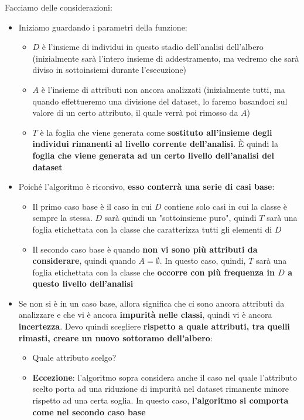 \documentclass[12pt]{article}
\begin{document}
Facciamo delle considerazioni:
\begin{itemize}
    \item Iniziamo guardando i parametri della funzione:
    \begin{itemize}
        \item $D$ è l'insieme di individui in questo stadio dell'analisi dell'albero (inizialmente sarà l'intero insieme di addestramento, ma vedremo che sarà diviso in sottoinsiemi durante l'esecuzione)
        \item $A$ è l'insieme di attributi non ancora analizzati (inizialmente tutti, ma quando effettueremo una divisione del dataset, lo faremo basandoci sul valore di un certo attributo, il quale verrà poi rimosso da $A$)
        \item $T$ è la foglia che viene generata come \textbf{sostituto all'insieme degli individui rimanenti al livello corrente dell'analisi}. È quindi la \textbf{foglia che viene generata ad un certo livello dell'analisi del dataset}
    \end{itemize}
    \item Poiché l'algoritmo è ricorsivo, \textbf{esso conterrà una serie di casi base}:
    \begin{itemize}
        \item Il primo caso base è il caso in cui $D$ contiene solo casi in cui la classe è sempre la stessa. $D$ sarà quindi un "sottoinsieme puro", quindi $T$ sarà una foglia etichettata con la classe che caratterizza tutti gli elementi di $D$
        \item Il secondo caso base è quando \textbf{non vi sono più attributi da considerare}, quindi quando $A = \emptyset$. In questo caso, quindi, $T$ sarà una foglia etichettata con la classe che \textbf{occorre con più frequenza in $D$ a questo livello dell'analisi}
    \end{itemize}
    \item Se non si è in un caso base, allora significa che ci sono ancora attributi da analizzare e che vi è ancora \textbf{impurità nelle classi}, quindi vi è ancora \textbf{incertezza}. Devo quindi scegliere \textbf{rispetto a quale attributi, tra quelli rimasti, creare un nuovo sottoramo dell'albero}:
    \begin{itemize}
        \item Quale attributo scelgo?
        \item \textbf{Eccezione}: l'algoritmo sopra considera anche il caso nel quale l'attributo scelto porta ad una riduzione di impurità nel dataset rimanente minore rispetto ad una certa soglia. In questo caso, \textbf{l'algoritmo si comporta come nel secondo caso base}
    \end{itemize}
\end{itemize}
\end{document}
